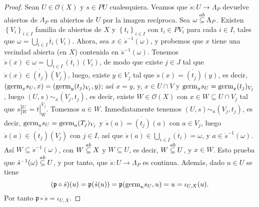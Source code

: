 \begin{proof}
   Sean $U\in\mathcal{O}(X)$ y $s\in PU$ cualesquiera. Veamos que $\dot{s}:U\to\Lambda_P$ devuelve abiertos de $\Lambda_P$ en abiertos de $U$ por la imagen recíproca. Sea $\omega\stackrel{ab}{\subseteq} \Lambda_P$. Existen $\left\lbrace V_i\right\rbrace_{i\in I}$ familia de abiertos de $X$ y $\left\lbrace t_i\right\rbrace_{i\in I}$ con $t_i\in PV_i$ para cada $i\in I$, tales que $\omega=\bigcup_{i\in I}\dot{t_i}(V_i)$. Ahora, sea $x\in\dot{s}^{-1}(\omega)$, y probemos que $x$ tiene una vecindad abierta (en $X$) contenida en $\dot{s}^{-1}(\omega)$. Tenemos $\dot{s}(x)\in\omega=\bigcup_{i\in I}\dot{(t_i)}(V_i)$, de modo que existe $j\in J$ tal que $\dot{s}(x)\in\dot{(t_{j})}(V_j)$, luego, existe $y\in V_j$ tal que $\dot{s}(x)=\dot{(t_j)}(y)$, es decir, $(\normalfont{\text{germ}}_{x}s_U,x)=(\normalfont{\text{germ}}_{y}(t_j)_{V_j},y)$; así $x=y$, y, $x\in U\cap V$ y $\normalfont{\text{germ}}_{x}s_{U}=\normalfont{\text{germ}}_{x}(t_j)_{V_j}$, luego $(U,s)\sim_{x}(V_j,t_j)$, es decir, existe $W\in\mathcal{O}(X)$ con $x\in W\subseteq U\cap V_j$ tal que $s|^{U}_{W}=t|^{V_j}_{W}$. Tomemos $a\in W$. Inmediatamente tenemos $(U,s)\sim_{a}(V_j,t_j)$, es decir, $\normalfont{\text{germ}}_{a}s_{U}=\normalfont{\text{germ}}_{a}(T_j)_{V_j}$ y $\dot{s}(a)=\dot{(t_j)}(a)$ con $a\in V_j$, luego $\dot{s}(a)\in\dot{(t_j)}(V_j)$ con $j\in I$, así que $\dot{s}(a)\in\bigcup_{i\in I}\dot{(t_i)}=\omega$, y $a\in\dot{s}^{-1}(\omega)$. Así $W\subseteq\dot{s}^{-1}(\omega)$, con $W\stackrel{ab}{\subseteq} X$ y $W\subseteq U$, es decir, $W\stackrel{ab}{\subseteq} U$, y $x\in W$. Esto prueba que $\dot{s}^{-1}(\omega)\stackrel{ab}{\subseteq} U$, y por tanto, que $\dot{s}:U\to\Lambda_P$ es continua. Además, dado $u\in U$ se tiene
   $$
      (\mathfrak{p}\circ\dot{s})(u)=\mathfrak{p}(\dot{s}(u))=\mathfrak{p}(\normalfont{\text{germ}}_{u}s_{U},u)=u=\iota_{U,X}(u).
   $$
   Por tanto $\mathfrak{p}\circ \dot{s}=\iota_{U,X}$.
\end{proof}
